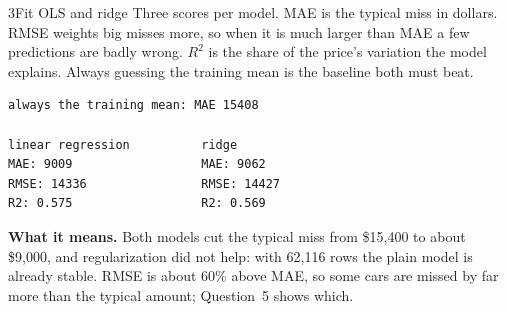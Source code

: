 \begin{labquestion}{3}{Fit OLS and ridge}
Three scores per model. MAE is the typical miss in dollars. RMSE weights big misses more, so when it is much larger than MAE a few predictions are badly wrong. $R^2$ is the share of the price's variation the model explains. Always guessing the training mean is the baseline both must beat.
\end{labquestion}
\begin{labanswer}

\begin{refoutput}
\begin{lstlisting}[style=utpterminal]
always the training mean: MAE 15408

linear regression          ridge
MAE: 9009                  MAE: 9062
RMSE: 14336                RMSE: 14427
R2: 0.575                  R2: 0.569
\end{lstlisting}
\end{refoutput}

\textbf{What it means.} Both models cut the typical miss from \$15,400 to about \$9,000, and regularization did not help: with 62,116 rows the plain model is already stable. RMSE is about 60\% above MAE, so some cars are missed by far more than the typical amount; Question~5 shows which.
\end{labanswer}


